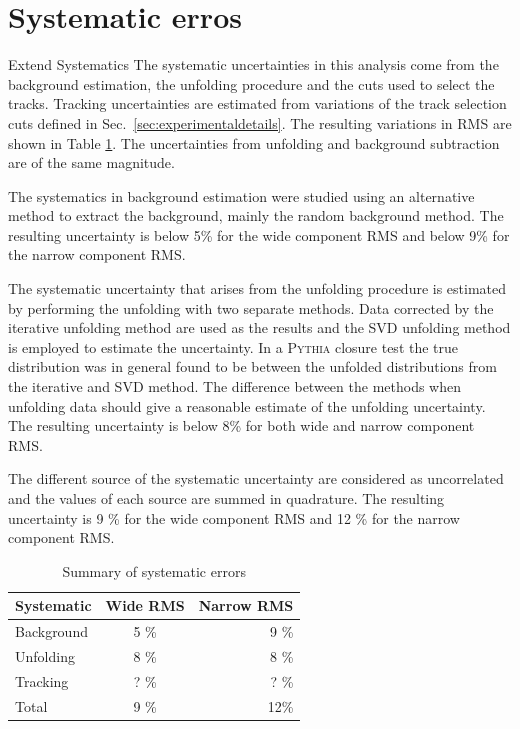 \section{Systematic erros}
{\color{red} Extend Systematics}
\label{sec:systematicerrors}
The systematic uncertainties in this analysis come from the background estimation, the unfolding procedure and the cuts used to select the tracks. Tracking uncertainties are estimated from variations of the track selection cuts defined in Sec.~\ref{sec:experimentaldetails}. The resulting variations in RMS are shown in Table \ref{tab:systematics}. The uncertainties from unfolding and background subtraction are of the same magnitude. 

The systematics in background estimation were studied using an alternative method to extract the background, mainly the random background method. The resulting uncertainty is below 5\% for the wide component RMS and below 9\% for the narrow component RMS. 

The systematic uncertainty that arises from the unfolding procedure is estimated by performing the unfolding with two separate methods. Data corrected by the iterative unfolding method are used as the results and the SVD unfolding method is employed to estimate the uncertainty. In a \textsc{Pythia} closure test the true distribution was in general found to be between the unfolded distributions from the iterative and SVD method. The difference between the methods when unfolding data should give a reasonable estimate of the unfolding uncertainty. The resulting uncertainty is below 8\% for both wide and narrow component RMS.

The different source of the systematic uncertainty are considered as uncorrelated and the values of each source are summed in quadrature. The resulting uncertainty is 9 \% for the wide component RMS and 12 \% for the narrow component RMS. 

\begin{table}[htb]
\centering
\caption{Summary of systematic errors}
\label{tab:systematics}
\begin{tabular}{ l | c | r }
  Systematic & Wide RMS & Narrow RMS \\
    \hline			
  Background & 5 \% & 9 \% \\
  Unfolding & 8 \% & 8 \% \\
  Tracking & ? \% & ? \% \\
  Total & 9 \% & 12\% \\
  \hline
  \end{tabular}
  \end{table}
  
